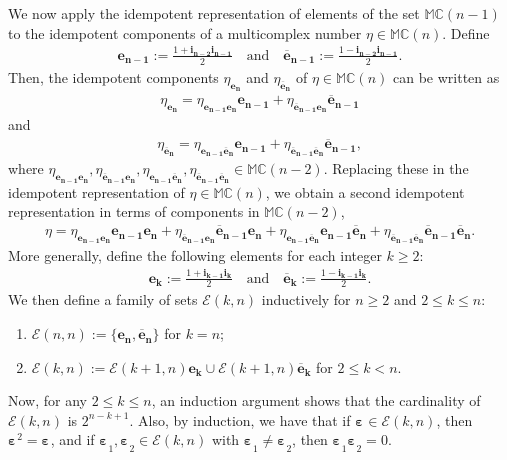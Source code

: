 \documentclass[12pt]{amsart}
\theoremstyle{plain}
\theoremstyle{definition}
\numberwithin{equation}{section}
\newcommand{\im}[1]{\mathbf{ i_{#1}}}
\newcommand{\be}[1]{\mathbf{e_{#1}}}
\newcommand{\bec}[1]{\mathbf{\overline{e}_{#1}}}
\newcommand{\bep}[1]{\bm{\varepsilon_{#1}}}
\newcommand{\mC}{\mathbb{C}}
\newcommand{\mM}{\mathbb{M}}
\begin{document}
	We now apply the idempotent representation of elements of the set $\mM \mC (n - 1)$ to the idempotent components of a multicomplex number $\eta \in \mM \mC (n)$. Define
		\begin{align*}
		\be{n-1} := \frac{1 + \im{n-2}\im{n-1}}{2} \quad \text{and}\quad  \bec{n-1} := \frac{1 - \im{n-2}\im{n-1}}{2} .
		\end{align*}
	Then, the idempotent components $\eta_{\be{n}}$ and $\eta_{\bec{n}}$ of $\eta \in \mM \mC (n)$ can be written as
		\begin{align*}
		\eta_{\be{n}} = \eta_{\be{n-1}\be{n}} \be{n-1} + \eta_{\bec{n-1}\be{n}} \bec{n-1}
		\end{align*}
	and
		\begin{align*}
		\eta_{\bec{n}} = \eta_{\be{n-1}\bec{n}} \be{n-1} + \eta_{\bec{n-1}\bec{n}} \bec{n-1},
		\end{align*}
	where $\eta_{\be{n-1}\be{n}}, \eta_{\bec{n-1} \be{n}}, \eta_{\be{n-1} \bec{n}} , \eta_{\bec{n-1} \bec{n}} \in \mM \mC (n - 2)$. Replacing these in the idempotent representation of $\eta \in \mM \mC (n)$, we obtain a second idempotent representation in terms of components in $\mM \mC (n - 2 )$,
		\begin{align*}
		\eta = \eta_{\be{n-1}\be{n}} \be{n-1} \be{n} + \eta_{\bec{n-1} \be{n}} \bec{n-1} \be{n} + \eta_{\be{n-1} \bec{n}} \be{n-1} \bec{n} + \eta_{\bec{n-1}\bec{n}} \bec{n-1} \bec{n} .
		\end{align*}
	More generally, define the following elements for each integer $ k \geq 2$:
		\begin{align*}
		\be{k} := \frac{1 + \im{k-1}\im{k}}{2} \quad \text{and} \quad \bec{k} := \frac{1 - \im{k-1}\im{k}}{2} .
		\end{align*}
	We then define a family of sets $\mathcal{E} (k, n)$ inductively for $n \geq 2$ and $2 \leq k \leq n$:
		\begin{enumerate}[label=\arabic*)]
		\item $\mathcal{E} (n, n) := \{ \be{n} , \bec{n} \}$ for $k = n$;
		\item $\mathcal{E} (k, n) := \mathcal{E} (k + 1, n) \be{k} \cup \mathcal{E} (k + 1 , n) \bec{k}$ for $2 \leq k < n$.
		\end{enumerate}
	Now, for any $2 \leq k \leq n$, an induction argument shows that the cardinality of $\mathcal{E} (k, n )$ is $2^{n - k + 1}$. Also, by induction, we have that
		if $\bep{} \in \mathcal{E}(k, n)$, then $\bep{}^2 = \bep{}$, and
		if ${\bep{}}_1 , {\bep{}}_2 \in \mathcal{E} (k, n)$ with ${\bep{}}_1 \neq {\bep{}}_2$, then ${\bep{}}_1 {\bep{}}_2 = 0$.
  
\end{document}
